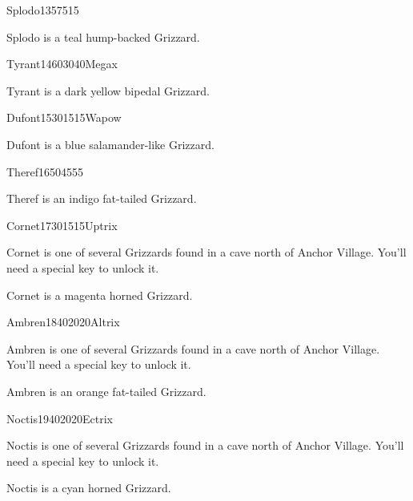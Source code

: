 \documentclass[10pt,twocolumn]{memoir}
\begin{document}
\begin{grizzardpage}{Splodo}{13}{5}{75}{15}{}

  Splodo is a teal hump-backed Grizzard.

\end{grizzardpage}

\begin{grizzardpage}{Tyrant}{14}{60}{30}{40}{Megax}

  Tyrant is a dark yellow bipedal Grizzard.

\end{grizzardpage}

\begin{grizzardpage}{Dufont}{15}{30}{15}{15}{Wapow}

  Dufont is a blue salamander-like Grizzard.

\end{grizzardpage}

\begin{grizzardpage}{Theref}{16}{50}{45}{55}{}

  Theref is an indigo fat-tailed Grizzard.

\end{grizzardpage}

\begin{grizzardpage}{Cornet}{17}{30}{15}{15}{Uptrix}

  Cornet is  one of several  Grizzards found in  a cave north  of Anchor
  Village. You'll need a special key to unlock it.

  Cornet is a magenta horned Grizzard.

\end{grizzardpage}

\begin{grizzardpage}{Ambren}{18}{40}{20}{20}{Altrix}

  Ambren is  one of several  Grizzards found in  a cave north  of Anchor
  Village. You'll need a special key to unlock it.

  Ambren is an orange fat-tailed Grizzard.

\end{grizzardpage}

\begin{grizzardpage}{Noctis}{19}{40}{20}{20}{Ectrix}

  Noctis is  one of several  Grizzards found in  a cave north  of Anchor
  Village. You'll need a special key to unlock it.

  Noctis is a cyan horned Grizzard.

\end{grizzardpage}
\end{document}
